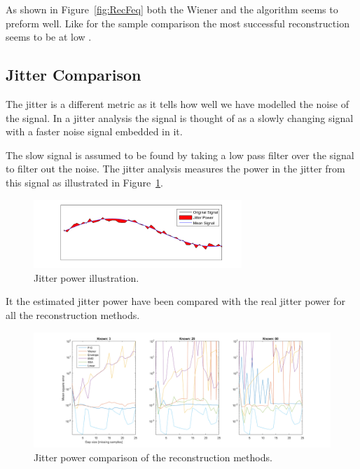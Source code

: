 As shown in Figure~\ref{fig:RecFeq} both the Wiener and the  algorithm seems to preform well. Like for the sample comparison the most successful reconstruction seems to be at low . 

\subsection{Jitter Comparison}
\label{T:jitterCom}

The jitter is a different metric as it tells how well we have modelled the noise of the signal. In a jitter analysis the signal is thought of as a slowly changing signal with a faster noise signal embedded in it.

The slow signal is assumed to be found by taking a low pass filter over the signal to filter out the noise. The jitter analysis measures the power in the jitter from this signal as illustrated in Figure~\ref{fig:JitPow}. 

\begin{figure}[H]
\centering
\includegraphics[width=0.7\textwidth]{billeder/JitterPower.png}
\caption{Jitter power illustration.}
\label{fig:JitPow}
\end{figure}

It the estimated jitter power have been compared with the real jitter power for all the reconstruction methods. 

\begin{figure}[H]
\centering
\includegraphics[width=1\textwidth]{billeder/RecJitter.png}
\caption{Jitter power comparison of the reconstruction methods.}
\label{fig:RecJit}
\end{figure}

